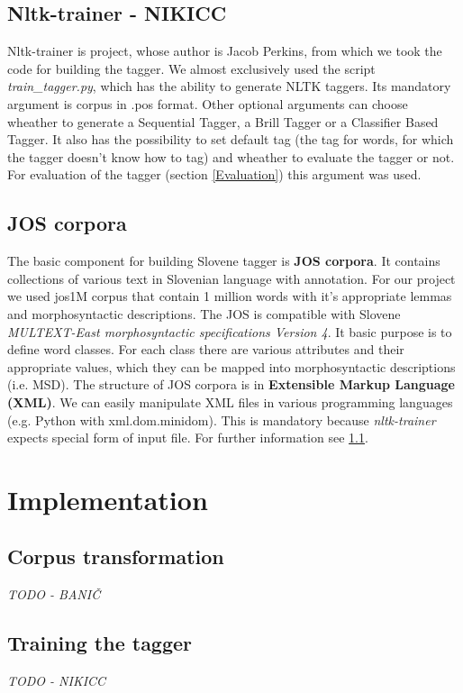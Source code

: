 \documentclass[11pt, conference, compsocconf]{IEEEtran}
\begin{document}
\subsection{Nltk-trainer - NIKICC}
Nltk-trainer\cite{nltk-trainer} is project, whose author is Jacob Perkins, from which we took the code for building the tagger. We almost exclusively used the script \textit{train\_tagger.py}, which has the ability to generate NLTK taggers. Its mandatory argument is corpus in .pos format. Other optional arguments can choose wheather to generate a Sequential Tagger, a Brill Tagger or a Classifier Based Tagger. It also has the possibility to set default tag (the tag for words, for which the tagger doesn't know how to tag) and wheather to evaluate the tagger or not. For evaluation of the tagger (section \ref{Evaluation}) this argument was used. 



\subsection{JOS corpora}
The basic component for building Slovene tagger is \textbf{JOS corpora}. It contains collections of various text in Slovenian language with annotation. For our project we used jos1M corpus that contain 1 million words with it's appropriate lemmas and morphosyntactic descriptions. The JOS is compatible with Slovene\textit{ MULTEXT-East morphosyntactic specifications Version 4}\cite{MULTEXT-East}. It basic purpose is to define word classes. For each class there are various attributes and their appropriate values, which they can be mapped into morphosyntactic descriptions (i.e. MSD). The structure of JOS corpora is in  \textbf{Extensible Markup Language (XML)}. We can easily manipulate XML files in various programming languages (e.g. Python with xml.dom.minidom). This is mandatory because \textit{nltk-trainer}\cite{nltk-trainer} expects special form of input file. For further information see \ref{Corpus transformation}.

\section{Implementation}
\subsection{Corpus transformation}\label{Corpus transformation}
\textit{TODO - BANIČ}
\subsection{Training the tagger}
\textit{TODO - NIKICC}
\end{document}
